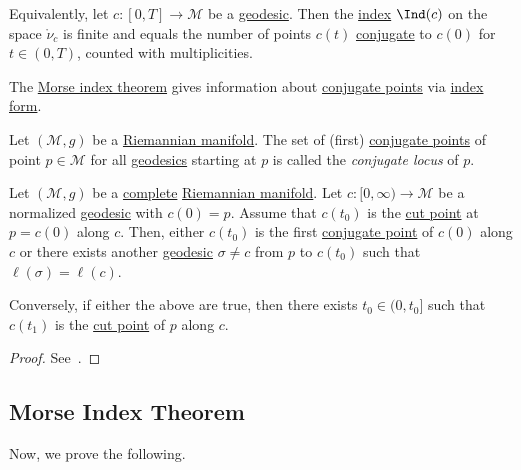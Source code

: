 \begin{remark}[Reformulation]
	Equivalently, let \(c\colon [0, T] \to \mathcal{M} \) be a \hyperref[def:geodesic]{geodesic}. Then the \hyperref[def:index]{index} \(\Ind(c)\) on the space \(\mathring{\nu }_c\) is finite and equals the number of points \(c(t)\) \hyperref[def:conjugate-point]{conjugate} to \(c(0)\) for \(t\in (0, T)\), counted with multiplicities.
\end{remark}

\begin{intuition}
	The \hyperref[thm:Morse-index]{Morse index theorem} gives information about \hyperref[def:conjugate-point]{conjugate points} via \hyperref[def:index-form]{index form}.
\end{intuition}

\begin{definition}\label{def:conjugate-locus}
	Let \((\mathcal{M} , g)\) be a \hyperref[def:Riemannian-manifold]{Riemannian manifold}. The set of (first) \hyperref[def:conjugate-point]{conjugate points} of point \(p\in \mathcal{M} \) for all \hyperref[def:geodesic]{geodesics} starting at \(p\) is called the \emph{conjugate locus} of \(p\).
\end{definition}

\begin{proposition}
	Let \((\mathcal{M} , g)\) be a \hyperref[def:geodesically-complete]{complete} \hyperref[def:Riemannian-manifold]{Riemannian manifold}. Let \(c\colon [0, \infty ) \to \mathcal{M} \) be a normalized \hyperref[def:geodesic]{geodesic} with \(c(0) = p\). Assume that \(c(t_0)\) is the \hyperref[def:cut-point]{cut point} at \(p = c(0)\) along \(c\). Then, either \(c(t_0)\) is the first \hyperref[def:conjugate-point]{conjugate point} of \(c(0)\) along \(c\) or there exists another \hyperref[def:geodesic]{geodesic} \(\sigma \neq c\) from \(p\) to \(c(t_0)\) such that \(\ell (\sigma ) = \ell (c)\).

		Conversely, if either the above are true, then there exists \(t_0 \in (0, t_0]\) such that \(c(t_1)\) is the \hyperref[def:cut-point]{cut point} of \(p\) along \(c\).
\end{proposition}
\begin{proof}
	See~\cite{flaherty2013riemannian}.
\end{proof}

\subsection{Morse Index Theorem}
Now, we prove the following.

